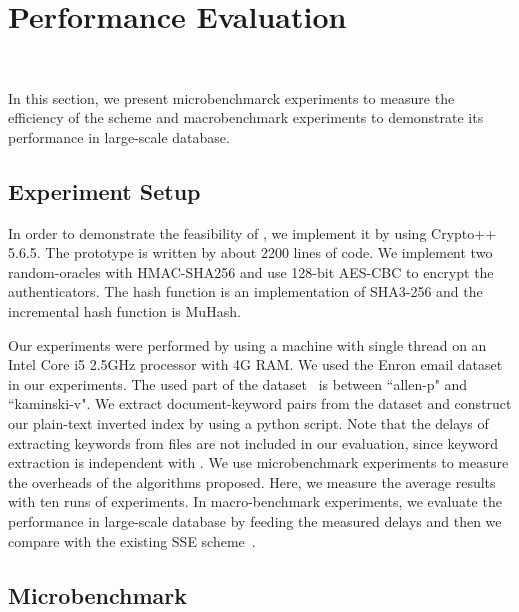 \section{Performance Evaluation}~\label{sec:experiments}

In this section, we present microbenchmarck experiments to measure the efficiency of the scheme and macrobenchmark experiments to demonstrate its performance in large-scale database.

\subsection{Experiment Setup}
In order to demonstrate the feasibility of \name, we implement it by using Crypto++ 5.6.5. The prototype is written by about 2200 lines of code. %
We implement two random-oracles with HMAC-SHA256 and use 128-bit AES-CBC to encrypt the authenticators. The hash function is an implementation of SHA3-256 and the incremental hash function is MuHash.

Our experiments were performed by using a machine with single thread on an Intel Core i5 2.5GHz processor with 4G RAM. %
We used the Enron email dataset~\cite{enron_email} in our experiments. The used part of the dataset~\cite{enron_email} is between ``allen-p" and ``kaminski-v". We extract document-keyword pairs from the dataset and construct our plain-text inverted index by using a python script. Note that the delays of extracting keywords from files are not included in our evaluation, since keyword extraction is independent with \name. We use microbenchmark experiments to measure the overheads of the algorithms proposed. Here, we measure the average results with ten runs of experiments. In macro-benchmark experiments, we evaluate the \name performance in large-scale database by feeding the measured delays and then we compare \name with the existing SSE scheme~\cite{cash2014dynamic}.
\subsection{Microbenchmark}


